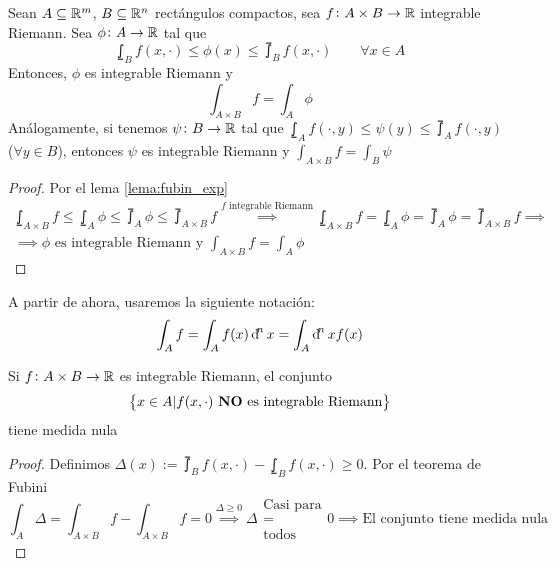 \begin{teo}[de Fubini]
    Sean $A \subseteq \mathbb{R}^m$, $B \subseteq \mathbb{R}^n$ rectángulos compactos, sea
    $f \colon A \times B \to \mathbb{R}$ integrable Riemann. Sea $\phi \colon A \to \mathbb{R}$
    tal que
    \[
        \lowint_B f(x, \cdot) \leq \phi(x) \leq \upint_B f(x, \cdot) \qquad
        \forall x \in A
    \]
    Entonces, $\phi$ es integrable Riemann y
    \[
        \int_{A \times B} f = \int_A \phi
    \]
    Análogamente, si tenemos $\psi \colon B \to \mathbb{R}$ tal que $\lowint_A f(\cdot, y)
    \leq \psi(y) \leq \upint_A f(\cdot, y)$ ($\forall y \in B$), entonces $\psi$ es
    integrable Riemann y $\int_{A \times B} f = \int_B \psi$
\end{teo}

\begin{proof}
    Por el lema \ref{lema:fubin_exp}
    \begin{gather*}
        \lowint_{A \times B} f \leq \lowint_A \phi \leq \upint_A \phi \leq
        \upint_{A \times B} f \stackrel{f \text{ integrable Riemann}}{\implies}
        \lowint_{A \times B} f = \lowint_A \phi = \upint_A \phi = \upint_{A \times B} f
        \implies \\ \implies \phi \text{ es integrable Riemann y } \int_{A \times B} f
        = \int_A \phi
    \end{gather*}
\end{proof}
\begin{obs}
    A partir de ahora, usaremos la siguiente notación:
    \[
        \int_A f = \int_A f(x) \dif^n x = \int_A \dif^n x f(x)
    \]
\end{obs}

\begin{obs}
    Si $f \colon A \times B \to \mathbb{R}$ es integrable Riemann, el conjunto
    \[
        \left\{x \in A \vert f(x, \cdot) \text{ \textbf{NO} es integrable Riemann}\right\}
    \]
    tiene medida nula
\end{obs}

\begin{proof}
    Definimos $\Delta(x) := \upint_B f(x, \cdot) - \lowint_B f(x, \cdot) \geq 0$. Por
    el teorema de Fubini
    \[
        \int_A \Delta = \int_{A \times B} f - \int_{A \times B} f = 0
        \stackrel{\Delta \geq 0}{\implies} \Delta \substack{\text{Casi para} \\ = \\
        \text{todos}} 0 \implies \text{El conjunto tiene medida nula}
    \]
\end{proof}

